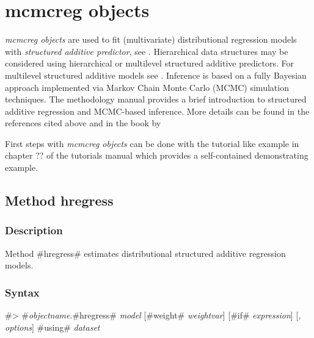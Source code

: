 \chapter{mcmcreg objects}
\label{mcmcreg} 



{\em mcmcreg objects} are used to fit (multivariate) distributional regression models with {\em
structured additive predictor}, see . Hierarchical data structures may be considered using
hierarchical or multilevel structured additive predictors. For multilevel structured additive models  see
. Inference is based on a fully Bayesian approach implemented via Markov Chain Monte Carlo (MCMC)
simulation techniques. The methodology manual provides a brief introduction to structured additive regression and MCMC-based
inference. More details can be found in the references cited above and in the book by 

First steps with {\em mcmcreg objects} can be done with the
tutorial like example in chapter ?? of the
tutorials manual which provides a self-contained demonstrating
example.


\clearpage

\section{Method hregress}
\label{mcmcregress} 

\subsection{Description}
\label{mcmcregregressdescr}

Method #hregress# estimates distributional structured additive regression models.

     

\subsection{Syntax}
\label{mcmcregregresssyntax}

 #> #{\em objectname}.#hregress# {\em model} [#weight# {\em weightvar}] [#if# {\em expression}] [{\em , options}] #using# {\em dataset}

